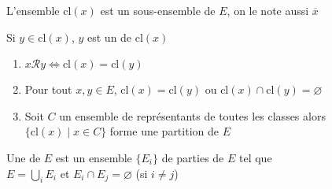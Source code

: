 
\begin{frame}

L’ensemble $\text{cl}(x)$ est un sous-ensemble de $E$, on le note aussi $\overline{x}$

\pause
\medskip

Si $y\in\text{cl}(x)$, $y$ est un  de $\text{cl}(x)$

\pause
\medskip

\begin{proposition}
\begin{enumerate}
  \item $x\mathcal{R}y  \Longleftrightarrow  \text{cl}(x)=\text{cl}(y)$

\pause

  \item Pour tout $x,y \in E$, $\text{cl}(x)=\text{cl}(y)$ ou 
$\text{cl}(x) \cap \text{cl}(y) = \varnothing$

\pause

  \item Soit $C$ un ensemble de représentants de toutes les classes 
alors $\big\{ \text{cl}(x) \mid x \in C \big\}$
forme une partition de $E$
\end{enumerate} 
\end{proposition}


\pause
\bigskip

\begin{minipage}{0.5\textwidth}
Une  de $E$ est un ensemble $\{E_i\}$ de parties de $E$ tel que \\
$E = \bigcup_i E_i$ et $E_i\cap E_j = \varnothing$ (si $i\neq j$)  
\end{minipage}\quad\quad
\begin{minipage}{0.39\textwidth}
\end{minipage}



\end{frame}


